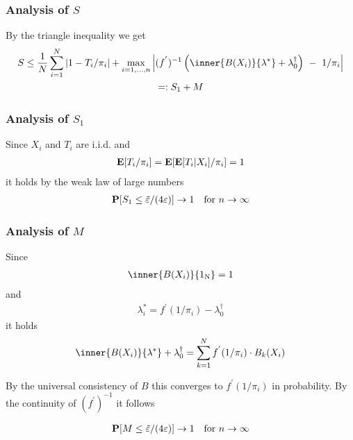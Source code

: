  \subsubsection*{Analysis of $S$}
 By the triangle inequality we get
 \begin{gather}
  S
  \le
  \frac{1}{N}
  \sum_{i=1}^{N} 
  |
  1
  -
  T_i
  /
  \pi_i
  |
  +
  \max_{i=1,\ldots,n}
     \left| 
     (f^{'})^{-1}
     \left( 
       \inner
       {B(X_i)}
       {\lambda^*}
       +
      \lambda^\dagger_0
     \right)
     \ 
      -
      \ 
      1/\pi_i
     \right|
     \\
     =:
     S_1
     +
     M
 \end{gather}

 \subsubsection*{Analysis of $S_1$}
 Since
 $X_i$ and $T_i$ are i.i.d. 
 and
 \begin{gather}
   \mathbf{E}[
  T_i
  /
  \pi_i
   ]
   =
   \mathbf{E}[
   \mathbf{E}[
  T_i
  |X_i
   ]
  /
  \pi_i
   ]
   =1
 \end{gather}
 it holds by the weak law of large numbers
 \begin{gather}
   \P[S_1\le 
   \tilde{\varepsilon}/(4\varepsilon)
   ]\to 1
   \quad
   \text{for}\ 
   n\to \infty
 \end{gather}
 \subsubsection*{Analysis of $M$}
 Since  
 \begin{gather}
   \inner{B(X_i)}{\mathrm{1_N}}=1
 \end{gather}
 and
 \begin{gather}
   \lambda^*_i
   =
  f^{'}(1/\pi_i)
  -
  \lambda^\dagger_0
 \end{gather}
 it holds
 \begin{gather}
       \inner
       {B(X_i)}
       {\lambda^*}
       +
      \lambda^\dagger_0
     =
    \sum_{k=1}^{N}  
  f^{'}(1/\pi_i)
  \cdot
       B_k(X_i)
 \end{gather}

By the universal consistency of $B$
this converges to $
f^{'}
(
1/\pi_i
)
$ in probability.
By the continuity of 
$
(
f^{'}
)^{-1}
$
it follows

 \begin{gather}
   \P[M\le 
   \tilde{\varepsilon}/(4\varepsilon)
   ]\to 1
   \quad
   \text{for}\ 
   n\to \infty
 \end{gather}
